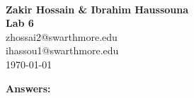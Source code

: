\documentclass[11pt]{article}
\begin{document}
\begin{center}
    \\
    \vspace{0.5cm}
    {\LARGE\bf Zakir Hossain \& Ibrahim Haussouna \\
        \vspace{0.25cm}
        Lab 6}\\[10pt]
    zhossai2@swarthmore.edu\\
    ihassou1@swarthmore.edu\\
    \vspace{0.25cm}
    \today
\end{center}

\LARGE\textbf{Answers:}
\end{document}
